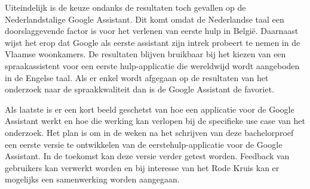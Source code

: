 Uiteindelijk is de keuze ondanks de resultaten toch gevallen op de Nederlandstalige Google Assistant. Dit komt omdat de Nederlandse taal een doorslaggevende factor is voor het verlenen van eerste hulp in België. Daarnaast wijst het erop dat Google als eerste assistant zijn intrek probeert te nemen in de Vlaamse woonkamers. De resultaten blijven bruikbaar bij het kiezen van een spraakassistent voor een eerste hulp-applicatie die wereldwijd wordt aangeboden in de Engelse taal. Als er enkel wordt afgegaan op de resultaten van het onderzoek naar de spraakkwaliteit dan is de Google Assistant de favoriet.

Als laatste is er een kort beeld geschetst van hoe een applicatie voor de Google Assistant werkt en hoe die werking kan verlopen bij de specifieke use case van het onderzoek. Het plan is om in de weken na het schrijven van deze bachelorproef een eerste versie te ontwikkelen van de eerstehulp-applicatie voor de Google Assistant. In de toekomst kan deze versie verder getest worden. Feedback van gebruikers kan verwerkt worden en bij interesse van het Rode Kruis kan er mogelijks een samenwerking worden aangegaan.